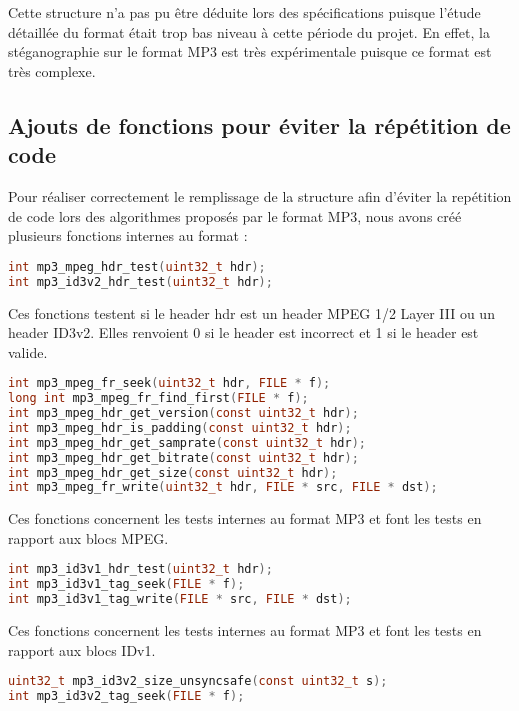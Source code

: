\documentclass[11pt]{article}
\begin{document}
Cette structure n'a pas pu être déduite lors des spécifications puisque 
l'étude détaillée du format était trop bas niveau à cette période du projet. 
En effet, la stéganographie sur le format MP3 est très expérimentale puisque 
ce format est très complexe. 

\subsection{Ajouts de fonctions pour éviter la répétition de code}

Pour réaliser correctement le remplissage de la structure afin d'éviter la
repétition de code lors des algorithmes proposés par le format MP3, 
nous avons créé plusieurs fonctions internes au format : 

\begin{lstlisting}[language=c]
int mp3_mpeg_hdr_test(uint32_t hdr);
int mp3_id3v2_hdr_test(uint32_t hdr);
\end{lstlisting}

Ces fonctions testent si le header hdr est un header MPEG 1/2 Layer III
ou un header ID3v2.
Elles renvoient 0 si le header est incorrect et 1 si le header est valide. 
\newline

\begin{lstlisting}[language=c]
int mp3_mpeg_fr_seek(uint32_t hdr, FILE * f);
long int mp3_mpeg_fr_find_first(FILE * f);
int mp3_mpeg_hdr_get_version(const uint32_t hdr);
int mp3_mpeg_hdr_is_padding(const uint32_t hdr);
int mp3_mpeg_hdr_get_samprate(const uint32_t hdr);
int mp3_mpeg_hdr_get_bitrate(const uint32_t hdr);
int mp3_mpeg_hdr_get_size(const uint32_t hdr);
int mp3_mpeg_fr_write(uint32_t hdr, FILE * src, FILE * dst);
\end{lstlisting}

Ces fonctions concernent les tests internes au format MP3 et font les tests 
en rapport aux blocs MPEG. 
\newline

\begin{lstlisting}[language=c]
int mp3_id3v1_hdr_test(uint32_t hdr);
int mp3_id3v1_tag_seek(FILE * f);
int mp3_id3v1_tag_write(FILE * src, FILE * dst);
\end{lstlisting}

Ces fonctions concernent les tests internes au format MP3 et font les tests 
en rapport aux blocs IDv1. 
\newline
\begin{lstlisting}[language=c]
uint32_t mp3_id3v2_size_unsyncsafe(const uint32_t s);
int mp3_id3v2_tag_seek(FILE * f);
\end{lstlisting}
\end{document}
